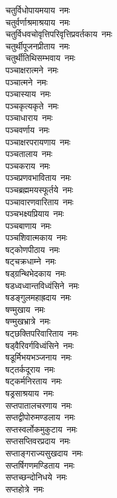 \begin{multicols}{2}
\begin{flushleft}
चतुर्विधोपायमयाय~नमः\\
चतुर्वर्णाश्रमाश्रयाय~नमः\\
चतुर्विधवचोवृत्तिपरिवृत्ति\-प्रवर्तकाय~नमः\\
चतुर्थीपूजनप्रीताय~नमः\\
चतुर्थीतिथिसम्भवाय~नमः\\
पञ्चाक्षरात्मने~नमः\\
पञ्चात्मने~नमः\\
पञ्चास्याय~नमः\\
पञ्चकृत्यकृते~नमः\\
पञ्चाधाराय~नमः\hfill{}\\
पञ्चवर्णाय~नमः\\
पञ्चाक्षरपरायणाय~नमः\\
पञ्चतालाय~नमः\\
पञ्चकराय~नमः\\
पञ्चप्रणवभाविताय~नमः\\
पञ्चब्रह्ममयस्फूर्तये~नमः\\
पञ्चावारणवारिताय~नमः\\
पञ्चभक्ष्यप्रियाय~नमः\\
पञ्चबाणाय~नमः\\
पञ्चशिवात्मकाय~नमः\hfill{}\\
षट्कोणपीठाय~नमः\\
षट्चक्रधाम्ने~नमः\\
षड्ग्रन्थिभेदकाय~नमः\\
षडध्वध्वान्तविध्वंसिने~नमः\\
षडङ्गुलमहाह्रदाय~नमः\\
षण्मुखाय~नमः\\
षण्मुखभ्रात्रे~नमः\\
षट्छक्तिपरिवारिताय~नमः\\
षड्वैरिवर्गविध्वंसिने~नमः\\
षडूर्मिभयभञ्जनाय~नमः\hfill{}\\
षट्तर्कदूराय~नमः\\
षट्कर्मनिरताय~नमः\\
षड्रसाश्रयाय~नमः\\
सप्तपातालचरणाय~नमः\\
सप्तद्वीपोरुमण्डलाय~नमः\\
सप्तस्वर्लोकमुकुटाय~नमः\\
सप्तसप्तिवरप्रदाय~नमः\\
सप्ताङ्गराज्यसुखदाय~नमः\\
सप्तर्षिगणमण्डिताय~नमः\\
सप्तच्छन्दोनिधये~नमः\hfill{}\\
सप्तहोत्रे~नमः\\

\end{flushleft}
\end{multicols}
